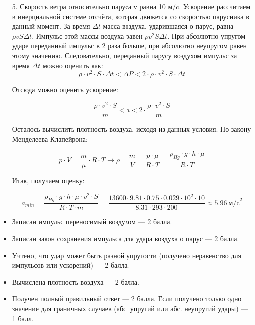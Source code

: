 \begin{enumerate}
    \item[5.] Скорость ветра относительно паруса v равна 10 м/c. Ускорение рассчитаем в инерциальной системе 
    отсчёта, которая движется со скоростью парусника в данный момент. За время $\Delta t$ 
    масса воздуха, ударившаяся о парус, равна $\rho vS \Delta t$. 
    Импульс этой массы воздуха равен $\rho v^2S \Delta t$. 
    При абсолютно упругом ударе переданный импульс в 2 
    раза больше, при абсолютно неупругом равен этому 
    значению. Следовательно, переданный парусу воздухом 
    импульс за время $\Delta t$ можно оценить как:
    $$\rho \cdot v^2\cdot S\cdot \Delta t< \Delta P<2\cdot \rho \cdot v^2\cdot S\cdot \Delta t$$
    
    Отсюда можно оценить ускорение:
    
    $$\frac{\rho \cdot v^2\cdot S}{m}< a<2\cdot \frac{\rho \cdot v^2\cdot S}{m}$$
    
    Осталось вычислить плотность воздуха, исходя из данных условия. По закону Менделеева-Клапейрона:
    
    $$p\cdot V=\frac{m}{\mu} \cdot R\cdot T \rightarrow  \rho =\frac{m}{V}=\frac{p\cdot \mu}{R\cdot T}=\frac{\rho_{Hg}\cdot g\cdot h\cdot \mu}{R\cdot T}$$
    
    Итак, получаем оценку: 
    
    $$a_{min}=\frac{\rho_{Hg}\cdot g\cdot h\cdot \mu\cdot v^2\cdot S}{R\cdot T\cdot m}=\frac{13600\cdot 9.81\cdot 0.75\cdot 0.029\cdot 10^2\cdot 10}{8.31\cdot 293\cdot 200} \approx 5.96 \: \text{м/c}^2$$
    
\end{enumerate}

\additionalCriteria

\begin{itemize}
    \item Записан импульс переносимый воздухом — 2 балла.
    \item Записан закон сохранения импульса для удара воздуха о парус — 2 балла.
    \item Учтено, что удар может быть разной упругости  (получено неравенство для импульсов или ускорений) — 2 балла.
    \item Вычислена плотность воздуха — 2 балла.
    \item Получен полный правильный ответ — 2 балла. Если получено только одно значение для граничных случаев (абс. упругий или абс. неупругий удары) — 1 балл.   
\end{itemize}